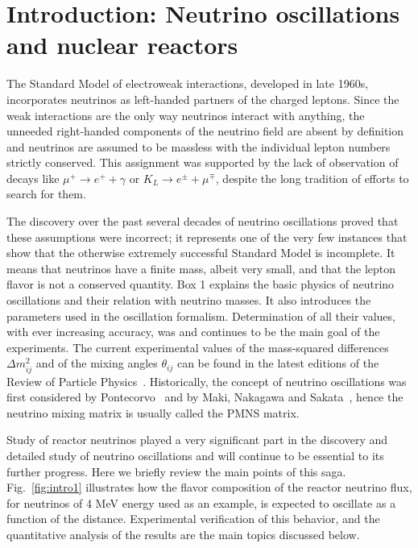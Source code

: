 \section{Introduction: Neutrino oscillations and nuclear reactors} 
\label{sec:intro}

The Standard Model of electroweak interactions,
developed in late 1960s, incorporates neutrinos as left-handed partners of the charged leptons. Since the weak interactions are the
only way neutrinos interact with anything, the unneeded right-handed components of the neutrino field are absent 
by definition and neutrinos are assumed to be massless with the individual lepton numbers strictly conserved.
This assignment was supported by the lack of observation of decays like 
$\mu^+ \rightarrow e^+ + \gamma$ or $K_L \rightarrow e^{\pm} + \mu^{\mp}$,
despite the long tradition of efforts to search for them.

The discovery over the past several decades
of neutrino oscillations proved that these assumptions were incorrect; it
represents one of the very few instances that show that the otherwise
extremely successful Standard Model is incomplete. It means that
neutrinos have a finite mass, albeit very small, and that the lepton flavor is not a conserved quantity.
Box 1 explains the basic physics of neutrino oscillations and their relation with neutrino masses. It
also introduces the parameters used in the oscillation formalism. Determination of all their values,
with ever increasing accuracy,
was and continues to be the main goal of the experiments.
The current experimental values of the mass-squared differences $\Delta m^2_{ij}$ and of the mixing angles $\theta_{ij}$ can be found
in the latest editions of the Review of Particle Physics~\cite{PDG14}.
Historically, the concept of neutrino oscillations was first considered by Pontecorvo~\cite{Pontecorvo57, Pontecorvo58}
and by Maki, Nakagawa and Sakata~\cite{MNS62}, hence the neutrino mixing matrix is usually called the PMNS matrix.

Study of reactor neutrinos played a very significant part in the discovery and detailed study of neutrino oscillations and will continue 
to be essential to its further progress. Here we briefly review
the main points of this saga. Fig.~\ref{fig:intro1} illustrates how the flavor composition of the reactor neutrino flux, for neutrinos of 4 MeV energy
used as an example, is expected to oscillate as a function of the distance. Experimental verification of this behavior, and the quantitative analysis of the
results are the main topics discussed below.

